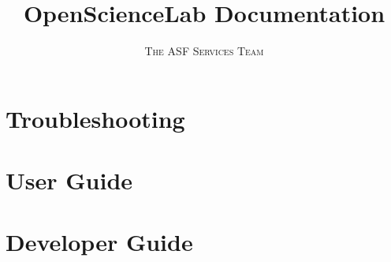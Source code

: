 \documentclass[a4paper,11pt,oneside]{book}
\title{\Huge \textbf{OpenScienceLab Documentation}}
\author{\textsc{The ASF Services Team}}
\begin{document}
\sloppy

\frontmatter
\maketitle

\tableofcontents

\mainmatter

% 
% 

\section{Troubleshooting}



\section{User Guide}









































\section{Developer Guide}
\end{document}
